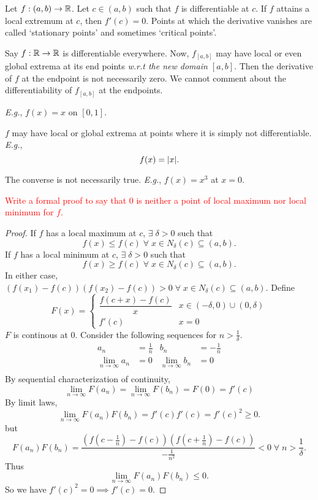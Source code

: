 \begin{thm} \label{thm:diff:local_extrema:stationary}
    Let $f : (a, b) \to \mathbb{R}$.
    Let $c \in (a, b)$ such that $f$ is differentiable at $c$.
    If $f$ attains a local extremum at $c$, then $f'(c) = 0$.
    Points at which the derivative vanishes are called `stationary points' and sometimes `critical points'.
\end{thm}
\begin{rem}
    Say $f : \mathbb{R} \to \mathbb{R}$ is differentiable everywhere.
    Now, $f_{[a, b]}$ may have local or even global extrema at its end points \emph{w.r.t the new domain $[a, b]$}.
    Then the derivative of $f$ at the endpoint is not necessarily zero.
    We cannot comment about the differentiability of $f_{[a, b]}$ at the endpoints.

    \textit{E.g.}, $f(x) = x$ on $[0, 1]$.
\end{rem}
\begin{rem}
    $f$ may have local or global extrema at points where it is simply not differentiable. \textit{E.g.}, \[
        f(x) = \abs{x}.
    \]
\end{rem}
\begin{rem}
    The converse is not necessarily true. \textit{E.g.}, $f(x) = x^{3}$ at $x = 0$.
\end{rem}
\textcolor{red}{Write a formal proof to say that 0 is neither a point of local maximum nor local minimum for $f$.}

\begin{proof}
    If $f$ has a local maximum at $c$, $\exists\; \delta > 0$ such that \[
        f(x) \leq f(c) \;\forall\; x \in N_{\delta}(c) \subseteq (a, b).
    \] If $f$ has a local minimum at $c$, $\exists\; \delta > 0$ such that \[
        f(x) \geq f(c) \;\forall\; x \in N_{\delta}(c) \subseteq (a, b).
    \] In either case, $(f(x_{1}) - f(c))(f(x_{2}) - f(c)) > 0 \;\forall\; x \in N_{\delta}(c) \subseteq (a, b)$.
    Define \[
        F(x) =
        \begin{cases}
            \dfrac{f(c + x) - f(c)}{x} & x \in (-\delta, 0) \cup (0, \delta) \\
            f'(c) & x = 0
        \end{cases}
    \] $F$ is continous at $0$. Consider the following sequences for $n > \frac{1}{\delta}$.
    \begin{align*}
        a_{n} &= \frac{1}{n} & b_{n} &= -\frac{1}{n} \\
        \lim_{n \to \infty} a_{n} &= 0 & \lim_{n \to \infty} b_{n} &= 0 \\
    \end{align*}
    By sequential characterization of continuity, \[
        \lim_{n \to \infty} F(a_{n}) = \lim_{n \to \infty} F(b_{n}) = F(0) = f'(c)
    \] By limit laws, \[
        \lim_{n \to \infty} F(a_{n}) F(b_{n}) = f'(c) f'(c) = f'(c)^{2} \geq 0.
    \] but \[
        F(a_{n}) F(b_{n}) = \frac{(f(c - \frac{1}{n}) - f(c))(f(c + \frac{1}{n}) - f(c))}{-\frac{1}{n^{2}}} < 0 \;\forall\; n > \frac{1}{\delta}.
    \] Thus \[
        \lim_{n \to \infty} F(a_{n}) F(b_{n}) \leq 0.
    \]
    So we have $f'(c)^{2} = 0 \implies f'(c) = 0$.
\end{proof}
